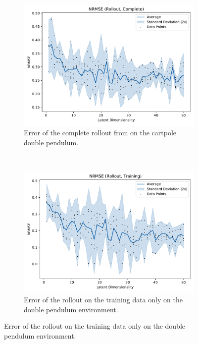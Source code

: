 			\begin{figure}
				\centering
				\begin{subfigure}{0.7\linewidth}
					\centering
					\includegraphics[width=\linewidth]{figures/results/acrobot-gym/latent-dim/comparison-rmse-rollout-normalized-mean-vs-latent-dim.pdf}
					\caption{Error of the complete rollout from on the cartpole double pendulum.}
					\label{fig:acrobotRmseComplete}
				\end{subfigure} \\
				\begin{subfigure}{0.5\linewidth}
					\centering
					\includegraphics[width=\linewidth]{figures/results/acrobot-gym/latent-dim/comparison-rmse-rollout-train-normalized-mean-vs-latent-dim.pdf}
					\caption{Error of the rollout on the training data only on the double pendulum environment.}

\end{subfigure}
\end{figure}
